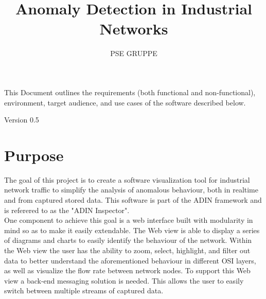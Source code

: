 \documentclass[twoside, english, draft]{Pflichtenheft}
\author{PSE GRUPPE}
\title{Anomaly Detection in Industrial Networks}
\begin{document}
\nocite{*}

\setpdf

\maketitle

This Document outlines the requirements (both functional and non-functional), environment, target audience, and use cases of the software described below.


\hfill

\begin{center}
	\large{Version 0.5}
\end{center}



\thispagestyle{empty}
\newpage
\thispagestyle{empty}
\tableofcontents
\cleardoublepage
\setcounter{page}{1}


\section{Purpose}\label{sec:intro}
The goal of this project is to create a software visualization tool for industrial network traffic to simplify the analysis of anomalous behaviour, both in realtime and from captured stored data.
\newline
\newline
This software is part of the ADIN framework and is referered to as the "ADIN Inspector".
\\
One component to achieve this goal is a web interface built with modularity in mind so as to make it easily extendable.
\newline
\newline
The Web view is able to display a series of \glspl{diagram} and charts to easily identify the behaviour of the network.
Within the Web view the user has the ability to zoom, select, highlight, and filter out data to better understand the aforementioned behaviour in different OSI layers, as well as visualize the flow rate between network nodes.
\newline
\newline
To support this Web view a back-end messaging solution is needed. This allows the user to easily switch between multiple streams of captured data.
\\
\end{document}
